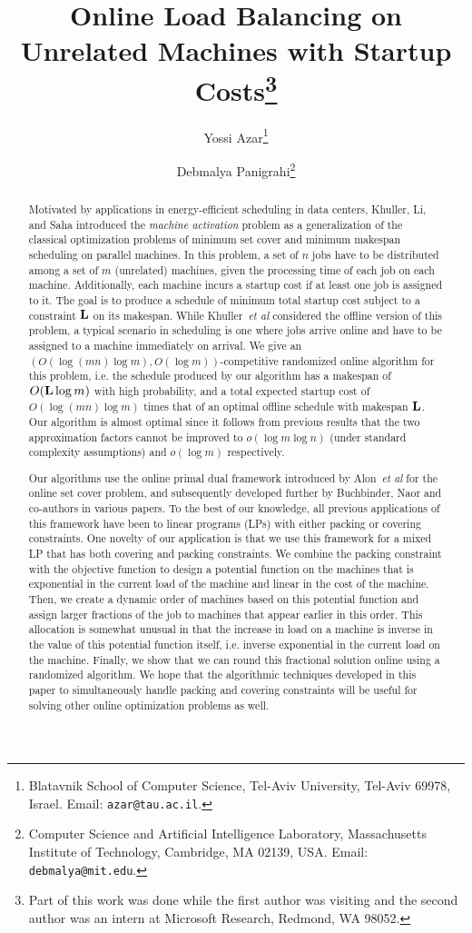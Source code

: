 \documentclass[11pt]{article}
\title{Online Load Balancing on Unrelated Machines with Startup Costs\thanks{Part
of this work was done while the first author was visiting and the
second author was an intern at Microsoft Research, Redmond, WA 98052.}}
\author{Yossi Azar\thanks{
Blatavnik School of Computer Science,
Tel-Aviv University, Tel-Aviv 69978, Israel. Email: {\tt azar@tau.ac.il}.}
\and Debmalya Panigrahi\thanks{
Computer Science and Artificial Intelligence Laboratory,
Massachusetts Institute of Technology,
Cambridge, MA 02139, USA. Email: {\tt debmalya@mit.edu}.}}
\date{}
\begin{document}
\maketitle

\thispagestyle{empty}

\begin{abstract}
Motivated by applications in energy-efficient scheduling in data 
centers, Khuller, Li, and Saha introduced the {\em machine activation} problem 
as a generalization of the classical optimization problems of minimum set cover 
and minimum makespan scheduling on parallel machines. 
In this problem, a set of $n$ jobs
have to be distributed among a set of $m$ (unrelated) machines, given the
processing time of each job on each machine. Additionally, each machine incurs
a startup cost if at least one job is assigned to it. 
The goal is to produce a schedule of minimum total
startup cost subject to a constraint $\bf L$ on its makespan.
While Khuller~{\em et al} considered the offline version of this problem, 
a typical scenario in scheduling is one where jobs arrive online and 
have to be assigned to a machine immediately on arrival. 
We give an $(O(\log (mn)\log m), O(\log m))$-competitive randomized online algorithm
for this problem, i.e. the schedule produced by our algorithm has 
a makespan of $O({\bf L} \log m)$ with high probability, and a total expected 
startup cost of 
$O(\log (mn)\log m)$ times that of an optimal offline schedule with makespan 
$\bf L$. Our algorithm is almost optimal since it follows from previous results
that the two approximation factors cannot be improved to $o(\log m\log n)$ 
(under standard complexity assumptions) and $o(\log m)$ respectively. 

Our algorithms use the online primal dual framework introduced by 
Alon~{\em et al} for the online set cover problem, and subsequently developed 
further by Buchbinder, Naor and co-authors in various papers. To the best of 
our knowledge, all previous applications of this framework have been to 
linear programs (LPs) with either packing or covering constraints. One 
novelty of our application is that we use this framework for a mixed LP that 
has both covering and packing constraints. We combine the packing constraint with
the objective function to design a potential function on the machines that is exponential
in the current load of the machine and linear in the cost of the machine.
Then, we create a dynamic order of machines based on this potential function and
assign larger fractions of the job to machines that appear earlier in this 
order. This allocation is somewhat unusual in that
the increase in load on a machine is inverse in the 
value of this potential function itself, i.e. inverse exponential in the
current load on the machine. Finally, we show that we can round
this fractional solution online using a randomized algorithm. 
We hope that the algorithmic 
techniques developed in this paper to simultaneously handle packing and
covering constraints will be useful for solving other online optimization 
problems as well. 

\end{abstract}
\end{document}
